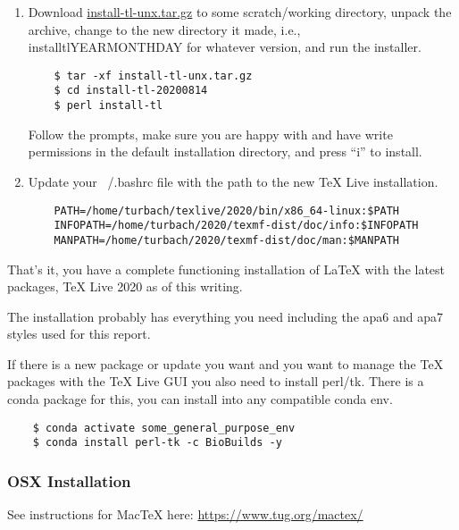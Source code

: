\documentclass[helv,letter,doc,natbib,11pt]{apa6}  %
\begin{document}
\begin{enumerate}

\item Download \url{install-tl-unx.tar.gz} to some scratch/working
  directory, unpack the archive, change to the new directory it
  made, i.e., \mbox{install\textendash tl\textendash YEARMONTHDAY} for
  whatever version, and run the installer.

  \begin{verbatim}
    $ tar -xf install-tl-unx.tar.gz 
    $ cd install-tl-20200814
    $ perl install-tl
  \end{verbatim}

  Follow the prompts, make sure you are happy with and have write
  permissions in the default installation directory, and press ``i''
  to install.

\item Update your ~/.bashrc file with the path to the new TeX Live
  installation.

  \begin{verbatim}
    PATH=/home/turbach/texlive/2020/bin/x86_64-linux:$PATH
    INFOPATH=/home/turbach/2020/texmf-dist/doc/info:$INFOPATH
    MANPATH=/home/turbach/2020/texmf-dist/doc/man:$MANPATH
  \end{verbatim}

\end{enumerate}

That's it, you have a complete functioning installation of \LaTeX{}
with the latest packages, TeX Live 2020 as of this writing.

The installation probably has everything you need including the apa6
and apa7 styles used for this report.

If there is a new package or update you want and you want to manage
the TeX packages with the TeX Live GUI you also need to install
perl/tk. There is a conda package for this, you can install into any
compatible conda env.

  \begin{verbatim}
    $ conda activate some_general_purpose_env
    $ conda install perl-tk -c BioBuilds -y
  \end{verbatim}


\subsubsection{OSX Installation}

See instructions for MacTeX here: \url{https://www.tug.org/mactex/}
\end{document}
